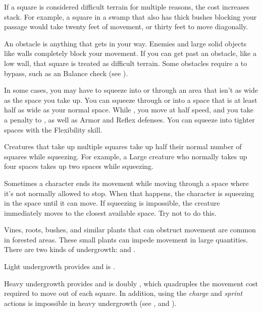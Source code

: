         If a square is considered difficult terrain for multiple reasons, the cost increases stack.
        For example, a square in a swamp that also has thick bushes blocking your passage would take twenty feet of movement, or thirty feet to move diagonally.

        An obstacle is anything that gets in your way. Enemies and large solid objects like walls completely block your movement. If you can get past an obstacle, like a low wall, that square is treated as difficult terrain. Some obstacles require a  to bypass, such as an Balance check (see ).

        \label{Squeezing}
        In some cases, you may have to squeeze into or through an area that isn't as wide as the space you take up.
        You can squeeze through or into a space that is at least half as wide as your normal space.
        While \squeezing, you move at half speed, and you take a  penalty to , as well as Armor and Reflex defenses.
        You can squeeze into tighter spaces with the Flexibility skill.

        Creatures that take up multiple squares take up half their normal number of squares while squeezing. For example, a Large creature who normally takes up four spaces takes up two spaces while squeezing.

         Sometimes a character ends its movement while moving through a space where it's not normally allowed to stop. When that happens, the character is squeezing in the space until it can move. If squeezing is impossible, the creature immediately moves to the closest available space. Try not to do this.

        \label{Undergrowth} Vines, roots, bushes, and similar plants that can obstruct movement are common in forested areas.
        These small plants can impede movement in large quantities.
        There are two kinds of undergrowth:  and .

        \label{Light Undergrowth}
        Light undergrowth provides  and is .

        \label{Heavy Undergrowth}
        Heavy undergrowth provides  and is doubly , which quadruples the movement cost required to move out of each square.
        In addition, using the \textit{charge} and \textit{sprint} actions is impossible in heavy undergrowth (see , and ).

